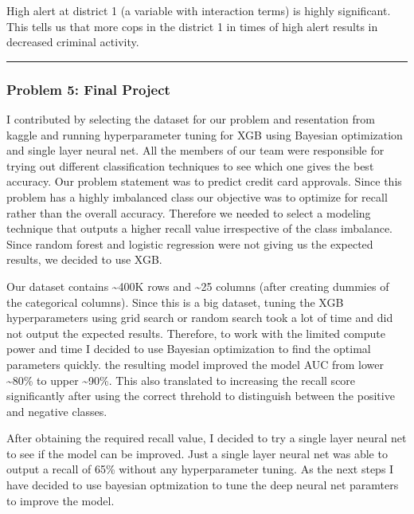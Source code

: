 \documentclass[
]{article}
\begin{document}
High alert at district 1 (a variable with interaction terms) is highly
significant. This tells us that more cops in the district 1 in times of
high alert results in decreased criminal activity.

\begin{center}\rule{0.5\linewidth}{0.5pt}\end{center}

\hypertarget{problem-5-final-project}{%
\subsubsection{Problem 5: Final Project}\label{problem-5-final-project}}

I contributed by selecting the dataset for our problem and resentation
from kaggle and running hyperparameter tuning for XGB using Bayesian
optimization and single layer neural net. All the members of our team
were responsible for trying out different classification techniques to
see which one gives the best accuracy. Our problem statement was to
predict credit card approvals. Since this problem has a highly
imbalanced class our objective was to optimize for recall rather than
the overall accuracy. Therefore we needed to select a modeling technique
that outputs a higher recall value irrespective of the class imbalance.
Since random forest and logistic regression were not giving us the
expected results, we decided to use XGB.

Our dataset contains \textasciitilde400K rows and \textasciitilde25
columns (after creating dummies of the categorical columns). Since this
is a big dataset, tuning the XGB hyperparameters using grid search or
random search took a lot of time and did not output the expected
results. Therefore, to work with the limited compute power and time I
decided to use Bayesian optimization to find the optimal parameters
quickly. the resulting model improved the model AUC from lower
\textasciitilde80\% to upper \textasciitilde90\%. This also translated
to increasing the recall score significantly after using the correct
threhold to distinguish between the positive and negative classes.

After obtaining the required recall value, I decided to try a single
layer neural net to see if the model can be improved. Just a single
layer neural net was able to output a recall of 65\% without any
hyperparameter tuning. As the next steps I have decided to use bayesian
optmization to tune the deep neural net paramters to improve the model.
\end{document}
